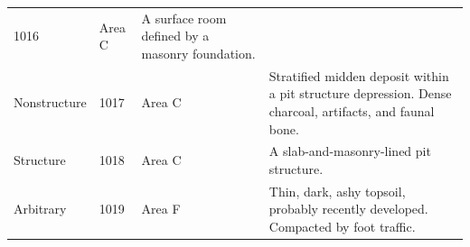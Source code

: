 \documentclass[
  12pt,
]{krantz}
\begin{document}
\begin{longtable}[]{@{}llll@{}}
\begin{minipage}[t]{0.11\columnwidth}
1016\strut
\end{minipage} & \begin{minipage}[t]{0.16\columnwidth}\raggedright
Area C\strut
\end{minipage} & \begin{minipage}[t]{0.38\columnwidth}\raggedright
A surface room defined by a
masonry foundation.\strut
\end{minipage}\tabularnewline
\begin{minipage}[t]{0.18\columnwidth}\raggedright
Nonstructure\strut
\end{minipage} & \begin{minipage}[t]{0.11\columnwidth}\raggedright
1017\strut
\end{minipage} & \begin{minipage}[t]{0.16\columnwidth}\raggedright
Area C\strut
\end{minipage} & \begin{minipage}[t]{0.38\columnwidth}\raggedright
Stratified midden deposit
within a pit structure
depression. Dense charcoal,
artifacts, and faunal bone.\strut
\end{minipage}\tabularnewline
\begin{minipage}[t]{0.18\columnwidth}\raggedright
Structure\strut
\end{minipage} & \begin{minipage}[t]{0.11\columnwidth}\raggedright
1018\strut
\end{minipage} & \begin{minipage}[t]{0.16\columnwidth}\raggedright
Area C\strut
\end{minipage} & \begin{minipage}[t]{0.38\columnwidth}\raggedright
A slab-and-masonry-lined pit
structure.\strut
\end{minipage}\tabularnewline
\begin{minipage}[t]{0.18\columnwidth}\raggedright
Arbitrary\strut
\end{minipage} & \begin{minipage}[t]{0.11\columnwidth}\raggedright
1019\strut
\end{minipage} & \begin{minipage}[t]{0.16\columnwidth}\raggedright
Area F\strut
\end{minipage} & \begin{minipage}[t]{0.38\columnwidth}\raggedright
Thin, dark, ashy topsoil,
probably recently developed.
Compacted by foot traffic.\strut
\end{minipage}\tabularnewline

\end{longtable}
\end{document}
